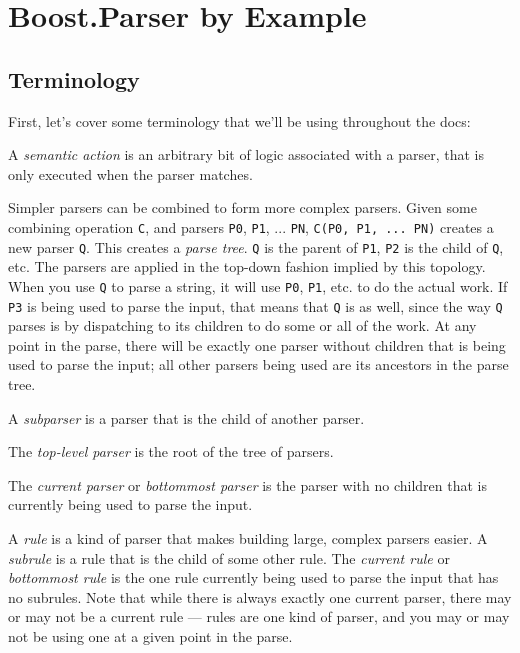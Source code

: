 \documentclass{MyBook}
\begin{document}
\frontmatter


\mainmatter
{}
\chapter{Boost.Parser by Example}


\section{Terminology}

First, let's cover some terminology that we'll be using throughout the docs:

A \emph{semantic action} is an arbitrary bit of logic associated with a parser, that is only executed when the parser matches.

Simpler parsers can be combined to form more complex parsers. Given some combining operation \texttt{C}, and parsers \texttt{P0}, \texttt{P1}, ... \texttt{PN}, \texttt{C(P0,\ P1,\ ...\ PN)} creates a new parser \texttt{Q}. This creates a \emph{parse tree}. \texttt{Q} is the parent of \texttt{P1}, \texttt{P2} is the child of \texttt{Q}, etc. The parsers are applied in the top-down fashion implied by this topology. When you use \texttt{Q} to parse a string, it will use \texttt{P0}, \texttt{P1}, etc. to do the actual work. If \texttt{P3} is being used to parse the input, that means that \texttt{Q} is as well, since the way \texttt{Q} parses is by dispatching to its children to do some or all of the work. At any point in the parse, there will be exactly one parser without children that is being used to parse the input; all other parsers being used are its ancestors in the parse tree.

A \emph{subparser} is a parser that is the child of another parser.

The \emph{top-level parser} is the root of the tree of parsers.

The \emph{current parser} or \emph{bottommost parser} is the parser with no children that is currently being used to parse the input.

A \emph{rule} is a kind of parser that makes building large, complex parsers easier. A \emph{subrule} is a rule that is the child of some other rule. The \emph{current rule} or \emph{bottommost rule} is the one rule currently being used to parse the input that has no subrules. Note that while there is always exactly one current parser, there may or may not be a current rule --- rules are one kind of parser, and you may or may not be using one at a given point in the parse.
\end{document}
